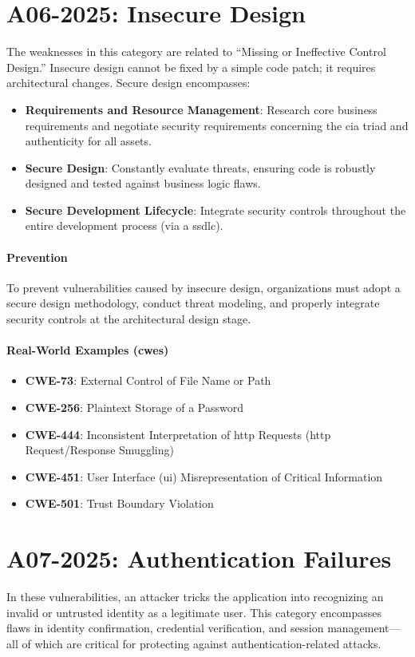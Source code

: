 \section{A06-2025: Insecure Design}
The weaknesses in this category are related to ``Missing or Ineffective Control Design.'' Insecure design cannot be fixed by a simple code patch; it requires architectural changes. Secure design encompasses:
\begin{itemize}
    \item \textbf{Requirements and Resource Management}: Research core business requirements and negotiate security requirements concerning the \gls{cia} triad and authenticity for all assets.
    \item \textbf{Secure Design}: Constantly evaluate threats, ensuring code is robustly designed and tested against business logic flaws.
    \item \textbf{Secure Development Lifecycle}: Integrate security controls throughout the entire development process (via a \gls{ssdlc}).
\end{itemize}

\paragraph{Prevention} To prevent vulnerabilities caused by insecure design, organizations must adopt a secure design methodology, conduct threat modeling, and properly integrate security controls at the architectural design stage.

\paragraph{Real-World Examples (\glspl{cwe})}
\begin{itemize}
    \item \textbf{CWE-73}: External Control of File Name or Path
    \item \textbf{CWE-256}: Plaintext Storage of a Password
    \item \textbf{CWE-444}: Inconsistent Interpretation of \gls{http} Requests (\gls{http} Request/Response Smuggling)
    \item \textbf{CWE-451}: User Interface (\gls{ui}) Misrepresentation of Critical Information
    \item \textbf{CWE-501}: Trust Boundary Violation
\end{itemize}

\section{A07-2025: Authentication Failures}
In these vulnerabilities, an attacker tricks the application into recognizing an invalid or untrusted identity as a legitimate user. This category encompasses flaws in identity confirmation, credential verification, and session management—all of which are critical for protecting against authentication-related attacks.

